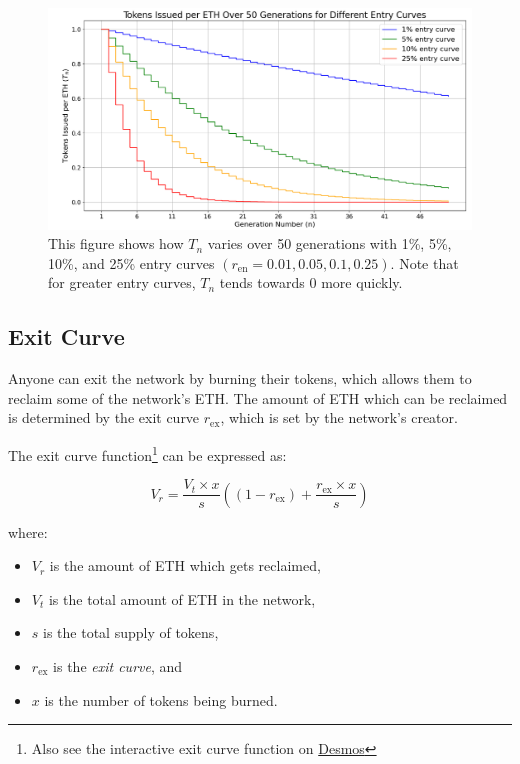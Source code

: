 \documentclass{article}
\begin{document}
\clearpage
\begin{figure}[h]
  \centering
  \includegraphics[width=\textwidth]{figures/multi-entry-curves.png}
  \caption{This figure shows how $T_n$ varies over 50 generations with 1\%, 5\%, 10\%, and 25\% entry curves $(r_{\text{en}} = 0.01, 0.05, 0.1, 0.25)$. Note that for greater entry curves, $T_n$ tends towards 0 more quickly.}
\end{figure}

\subsection{Exit Curve}

Anyone can exit the network by burning their tokens, which allows them to reclaim some of the network's ETH. The amount of ETH which can be reclaimed is determined by the exit curve $r_{\text{ex}}$, which is set by the network's creator.

The exit curve function\footnote{Also see the interactive exit curve function on \href{https://www.desmos.com/calculator/9pewqesyj5}{Desmos}} can be expressed as:

\begin{equation}
  V_r = \frac{V_t \times x}{s}\left(\left(1-r_{\text{ex}}\right)+\frac{r_{\text{ex}} \times x}{s}\right)
\end{equation}

where:
\begin{itemize}
  \item $V_r$ is the amount of ETH which gets reclaimed,
  \item $V_t$ is the total amount of ETH in the network,
  \item $s$ is the total supply of tokens,
  \item $r_{\text{ex}}$ is the \textit{exit curve}, and
  \item $x$ is the number of tokens being burned.
\end{itemize}
\end{document}
